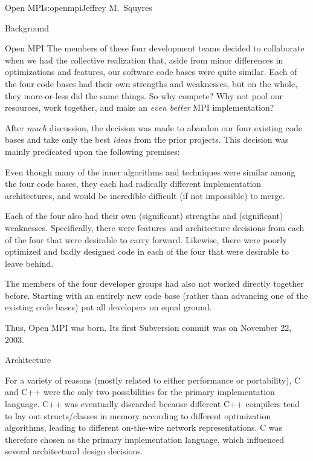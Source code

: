 \begin{aosachapter}{Open MPI}{s:openmpi}{Jeffrey M.\ Squyres}
\begin{aosasect1}{Background}
\begin{aosasect2}{Open MPI}
The members of these four development teams decided to collaborate
when we had the collective realization that, aside from minor
differences in optimizations and features, our software code bases
were quite similar.  Each of the four code bases had their own
strengths and weaknesses, but on the whole, they more-or-less did the
same things.  So why compete?  Why not pool our resources, work
together, and make an {\em even better} MPI implementation?

After {\em much} discussion, the decision was made to abandon our four
existing code bases and take only the best {\em ideas} from the prior
projects.  This decision was mainly predicated upon the following
premises:

\begin{aosaitemize}
\item Even though many of the inner algorithms and techniques were
  similar among the four code bases, they each had radically different
  implementation architectures, and would be incredible difficult (if
  not impossible) to merge.
\item Each of the four also had their own (significant) strengths and
  (significant) weaknesses.  Specifically, there were features and
  architecture decisions from each of the four that were desirable to
  carry forward.  Likewise, there were poorly optimized and badly
  designed code in each of the four that were desirable to leave
  behind.
\item The members of the four developer groups had also not worked
  directly together before.  Starting with an entirely new code base
  (rather than advancing one of the existing code bases) put all
  developers on equal ground.
\end{aosaitemize}

Thus, Open MPI was born.  Its first Subversion commit was on November
22, 2003.

\end{aosasect2}

\end{aosasect1}


\begin{aosasect1}{Architecture}

For a variety of reasons (mostly related to either performance or
portability), C and C++ were the only two possibilities for the
primary implementation language.  
%
C++ was eventually discarded because different C++ compilers tend to
lay out structs/classes in memory according to different optimization
algorithms, leading to different on-the-wire network representations.
%
C was therefore chosen as the primary implementation language, which
influenced several architectural design decisions.


\end{aosasect1}
\end{aosachapter}

